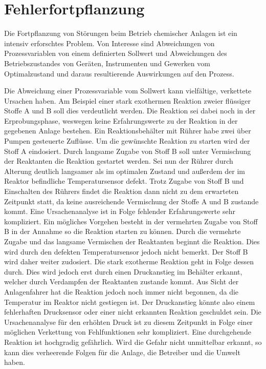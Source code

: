\chapter{Fehlerfortpflanzung} \label{ch:fehlerfortpfl}
Die Fortpflanzung von St\"orungen beim Betrieb chemischer Anlagen ist ein intensiv erforschtes Problem. Von Interesse sind Abweichungen von Prozessvariablen von einem definierten Sollwert und Abweichungen des Betriebszustandes von Ger\"aten, Instrumenten und Gewerken vom Optimalzustand und daraus resultierende Auswirkungen auf den Prozess.

Die Abweichung einer Prozessvariable vom Sollwert kann vielf\"altige, verkettete Ursachen haben. Am Beispiel einer stark exothermen Reaktion zweier fl\"ussiger Stoffe A und B soll dies verdeutlicht werden. Die Reaktion sei dabei noch in der Erprobungsphase, weswegen keine Erfahrungswerte zu der Reaktion in der gegebenen Anlage bestehen. \newline
Ein Reaktionsbeh\"alter mit R\"uhrer habe zwei \"uber Pumpen gesteuerte Zufl\"usse. Um die gew\"unschte Reaktion zu starten wird der Stoff A eindosiert. Durch langsame Zugabe von Stoff B soll unter Vermischung der Reaktanten die Reaktion gestartet werden. Sei nun der R\"uhrer durch Alterung deutlich langsamer als im optimalen Zustand und au\ss{}erdem der im Reaktor befindliche Temperatursensor defekt. Trotz Zugabe von Stoff B und Einschalten des R\"uhrers findet die Reaktion dann nicht zu dem erwarteten Zeitpunkt statt, da keine ausreichende Vermischung der Stoffe A und B zustande kommt. Eine Ursachenanalyse ist in Folge fehlender Erfahrungswerte sehr kompliziert. Ein m\"ogliches Vorgehen besteht in der vermehrten Zugabe von Stoff B in der Annahme so die Reaktion starten zu k\"onnen. Durch die vermehrte Zugabe und das langsame Vermischen der Reaktanten beginnt die Reaktion. Dies wird durch den defekten Temperatursensor jedoch nicht bemerkt. Der Stoff B wird daher weiter zudosiert. Die stark exotherme Reaktion geht in Folge dessen durch. Dies wird jedoch erst durch einen Druckanstieg im Beh\"alter erkannt, welcher durch Verdampfen der Reaktanten zustande kommt. Aus Sicht der Anlagenfahrer hat die Reaktion jedoch noch immer nicht begonnen, da die Temperatur im Reaktor nicht gestiegen ist. Der Druckanstieg k\"onnte also einem fehlerhaften Drucksensor oder einer nicht erkannten Reaktion geschuldet sein. Die Ursachenanalyse f\"ur den erh\"ohten Druck ist zu diesem Zeitpunkt in Folge einer m\"oglichen Verkettung von Fehlfunktionen sehr kompliziert. Eine durchgehende Reaktion ist hochgradig gef\"ahrlich. Wird die Gefahr nicht unmittelbar erkannt, so kann dies verheerende Folgen f\"ur die Anlage, die Betreiber und die Umwelt haben.

